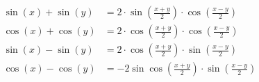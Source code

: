 \begin{equation}
\begin{split}
    \sin(x) + \sin(y) &= 2 \cdot \sin\left( \frac{x + y}{2} \right) \cdot \cos\left( \frac{x - y}{2} \right) \\
    \cos(x) + \cos(y) &= 2 \cdot \cos\left( \frac{x + y}{2} \right) \cdot \cos\left( \frac{x - y}{2} \right) \\
    \sin(x) - \sin(y) &= 2 \cdot \cos\left( \frac{x + y}{2} \right) \cdot \sin\left( \frac{x - y}{2} \right) \\
    \cos(x) - \cos(y) &= -2 \sin \cos\left( \frac{x + y}{2} \right) \cdot \sin\left( \frac{x - y}{2} \right)
\end{split}
\end{equation}
